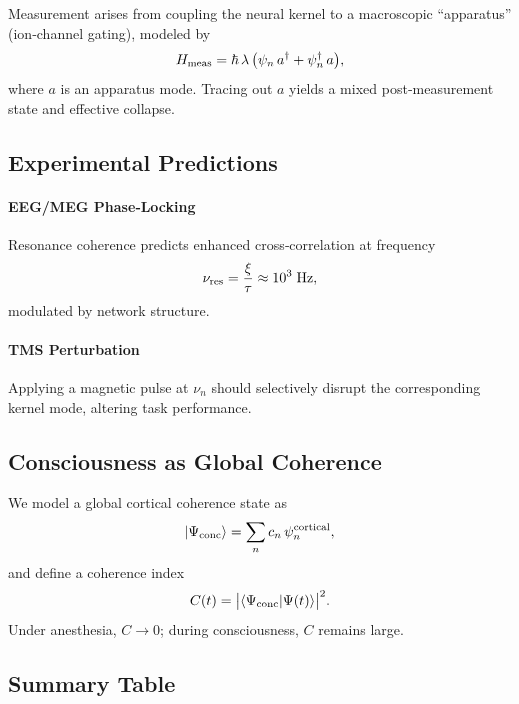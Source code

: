 Measurement arises from coupling the neural kernel to a macroscopic “apparatus” (ion‐channel gating), modeled by
\begin{equation}\label{eq:measurement_H}
H_{\rm meas}
= \hbar\,\lambda\,\bigl(\psi_n\,a^\dagger + \psi_n^\dagger\,a\bigr),
\end{equation}
where \(a\) is an apparatus mode.  Tracing out \(a\) yields a mixed post‐measurement state and effective collapse.

\subsection{Experimental Predictions}

\paragraph{EEG/MEG Phase‐Locking}  
Resonance coherence predicts enhanced cross‐correlation at frequency
\begin{equation}\label{eq:resonance_freq}
\nu_{\rm res} = \frac{\xi}{\tau} \approx 10^3\;\text{Hz},
\end{equation}
modulated by network structure.

\paragraph{TMS Perturbation}  
Applying a magnetic pulse at \(\nu_n\) should selectively disrupt the corresponding kernel mode, altering task performance.

\subsection{Consciousness as Global Coherence}

We model a global cortical coherence state as
\begin{equation}\label{eq:global_state}
|\Psi_{\rm conc}\rangle
= \sum_{n} c_n\,\psi_n^{\rm cortical},
\end{equation}
and define a coherence index
\begin{equation}\label{eq:coherence_index}
C(t) = \bigl|\langle \Psi_{\rm conc}|\Psi(t)\rangle\bigr|^2.
\end{equation}
Under anesthesia, \(C\to0\); during consciousness, \(C\) remains large.

\subsection{Summary Table}


